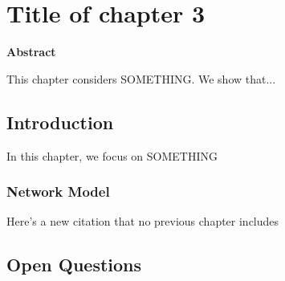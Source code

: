 
\chapter{Title of chapter 3}


  \begin{center}
  \textbf{\LARGE Abstract}
  \end{center}

  This chapter considers SOMETHING.
  We show that...

\clearpage

\section{Introduction} 

In this chapter, we focus on SOMETHING

\subsection{Network Model}


Here's a new citation that no previous chapter includes ~\cite{akaike2011akaike}


\clearpage


\section{Open Questions}

\clearpage






